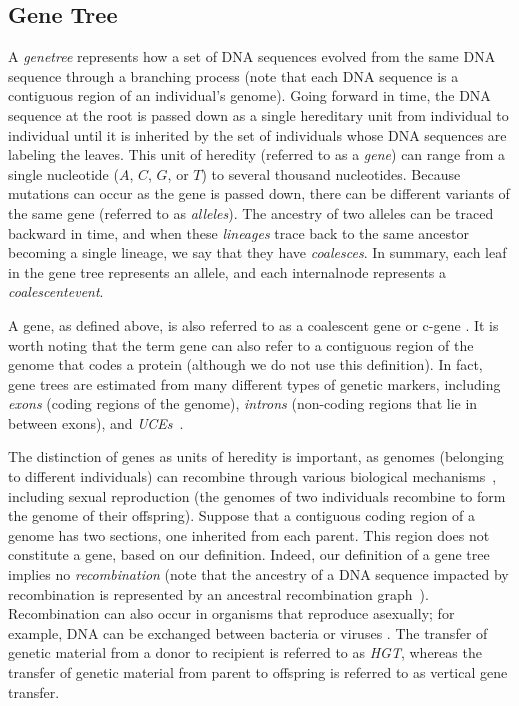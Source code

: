 \subsection{Gene Tree}
\label{sec:background-gene}
A \textit{\gls{genetree}} represents how a set of DNA sequences evolved from the same DNA sequence through a branching process (note that each DNA sequence is a contiguous region of an individual's genome).
Going forward in time, the DNA sequence at the root is passed down as a single hereditary unit from individual to individual until it is inherited by the set of individuals whose DNA sequences are labeling the leaves.
This unit of heredity (referred to as a \textit{\gls{gene}}) can range from a single nucleotide ($A$, $C$, $G$, or $T$) to several thousand nucleotides.
Because mutations can occur as the gene is passed down, there can be different variants of the same gene (referred to as \textit{\glspl{allele}}). 
The ancestry of two alleles can be traced backward in time, and when these \textit{\glspl{lineage}} trace back to the same ancestor becoming a single lineage, we say that they have \textit{\glspl{coalesce}}.
In summary, each leaf in the gene tree represents an allele, and each \gls{internalnode} represents a \textit{\gls{coalescentevent}}.

A gene, as defined above, is also referred to as a coalescent gene or c-gene \cite{springer2016gene}.
It is worth noting that the term gene can also refer to a contiguous region of the genome that codes a protein (although we do not use this definition).
In fact, gene trees are estimated from many different types of genetic markers, including \textit{\glspl{exon}} (coding regions of the genome),  \textit{\glspl{intron}} (non-coding regions that lie in between exons), and \textit{\glspl{UCE}}~\cite{bejerano2004ultraconserved, faircloth2017identifying}.

The distinction of genes as units of heredity is important, as genomes (belonging to different individuals) can recombine through various biological mechanisms~\cite{posada2002recombination}, including sexual reproduction (the genomes of two individuals recombine to form the genome of their offspring).
Suppose that a contiguous coding region of a genome has two sections, one inherited from each parent.
This region does not constitute a gene, based on our definition.
Indeed, our definition of a gene tree implies no \textit{\gls{recombination}} (note that the ancestry of a DNA sequence impacted by recombination is represented by an ancestral recombination graph~\cite{griffiths1996ancestral}).
Recombination can also occur in organisms that reproduce asexually; for example, DNA can be exchanged between bacteria \cite{posada2001intraspecific, gogarten2005horizontal, boto2009horizontal} or viruses \cite{perezlosado2015recombination}.
The transfer of genetic material from a donor to recipient is referred to as \textit{\gls{HGT}}, whereas the transfer of genetic material from parent to offspring is referred to as vertical gene transfer.


